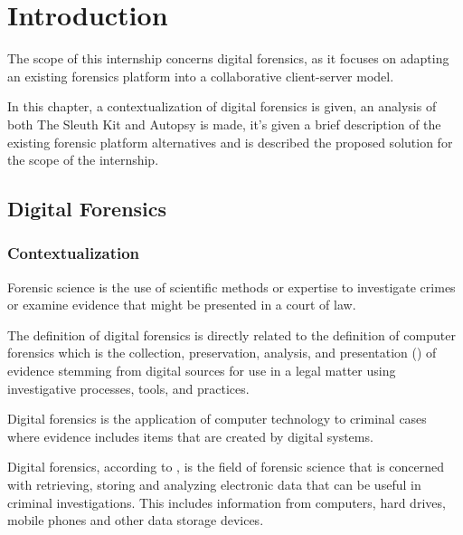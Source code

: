 
%

\chapter{Introduction}
\label{ch:introduction}

The scope of this internship concerns digital forensics, as it focuses on adapting an existing forensics platform into a collaborative client-server model.

In this chapter, a contextualization of digital forensics is given, an analysis of both The Sleuth Kit and Autopsy is made, it's given a brief description of
the existing forensic platform alternatives and is described the proposed solution for the scope of the internship.

\section{Digital Forensics}

\subsection{Contextualization}

Forensic science is the use of scientific methods or expertise to investigate crimes
or examine evidence that might be presented in a court of law.

The definition of digital forensics is directly related to the definition of
computer forensics which is the collection, preservation, analysis,
and presentation (\cite{daniels}) of evidence stemming from digital sources for use in a legal matter
using investigative processes, tools, and practices.

Digital forensics is the application of computer technology to criminal cases where evidence
includes items that are created by digital systems.

Digital forensics, according to \cite{nist}, is the field of forensic science that is concerned with retrieving,
storing and analyzing electronic data that can be useful in criminal investigations.
This includes information from computers, hard drives, mobile phones and other data
storage devices.

